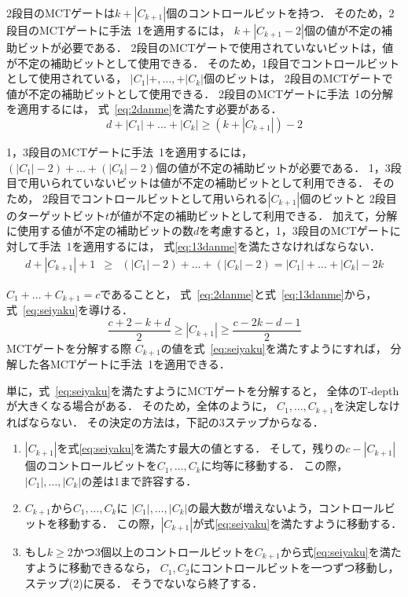 \par
2段目のMCTゲートは$k+|C_{k+1}|$個のコントロールビットを持つ．
そのため，2段目のMCTゲートに手法~1を適用するには，
$k+|C_{k+1}-2|$個の値が不定の補助ビットが必要である．
2段目のMCTゲートで使用されていないビットは，値が不定の補助ビットとして使用できる．
そのため，1段目でコントロールビットとして使用されている，
$|C_{1}|+,\dots, +|C_{k}|$個のビットは，
2段目のMCTゲートで値が不定の補助ビットとして使用できる．
2段目のMCTゲートに手法~1の分解を適用するには，
式~\ref{eq:2danme}を満たす必要がある．
\begin{equation}\label{eq:2danme}
  d+|C_{1}|+\dots +|C_{k}|\geq (k+|C_{k+1}|)-2
\end{equation}
\par
1，3段目のMCTゲートに手法~1を適用するには，
$(|C_{1}|-2)+\dots+(|C_{k}|-2)$個の値が不定の補助ビットが必要である．
1，3段目で用いられていないビットは値が不定の補助ビットとして利用できる．
そのため，
2段目でコントロールビットとして用いられる$|C_{k+1}|$個のビットと
2段目のターゲットビット$t$が値が不定の補助ビットとして利用できる．
加えて，分解に使用する値が不定の補助ビットの数$d$を考慮すると，1，3段目のMCTゲートに対して手法~1を適用するには，
式\ref{eq:13danme}を満たさなければならない．
\begin{eqnarray}\label{eq:13danme}
  d+|C_{k+1}|+1&\geq& (|C_{1}|-2)+\dots+(|C_{k}|-2)=|C_{1}|+\dots+|C_{k}|-2k
\end{eqnarray}
\par
$C_{1}+\dots +C_{k+1}=c$であることと，
式~\ref{eq:2danme}と式~\ref{eq:13danme}から，
式~\ref{eq:seiyaku}を導ける．
\begin{equation}\label{eq:seiyaku}
  \frac{c+2-k+d}{2}\geq|C_{k+1}|\geq \frac{c-2k-d-1}{2}
\end{equation}
MCTゲートを分解する際
$C_{k+1}$の値を式~\ref{eq:seiyaku}を満たすようにすれば，
分解した各MCTゲートに手法~1を適用できる．
\par
単に，式~\ref{eq:seiyaku}を満たすようにMCTゲートを分解すると，
全体のT-depthが大きくなる場合がある．
そのため，全体のように，
$C_{1},\dots,C_{k+1}$を決定しなければならない．
その決定の方法は，下記の3ステップからなる．
\begin{enumerate}[ステップ(1)]
  \item $|C_{k+1}|$を式\ref{eq:seiyaku}を満たす最大の値とする．
  そして，残りの$c-|C_{k+1}|$個のコントロールビットを$C_{1},\dots,C_{k}$に均等に移動する．
  この際，$|C_{1}|,\dots,|C_{k}|$の差は1まで許容する．
  \item $C_{k+1}$から$C_{1},\dots,C_{k}$に
  $|C_{1}|,\dots,|C_{k}|$の最大数が増えないよう，コントロールビットを移動する．
  この際，$|C_{k+1}|$が式\ref{eq:seiyaku}を満たすように移動する．
  \item  
  もし$k\geq 2$かつ3個以上のコントロールビットを$C_{k+1}$から式\ref{eq:seiyaku}を満たすように移動できるなら，
  $C_{1},C_{2}$にコントロールビットを一つずつ移動し，ステップ(2)に戻る．
  そうでないなら終了する．
\end{enumerate}
